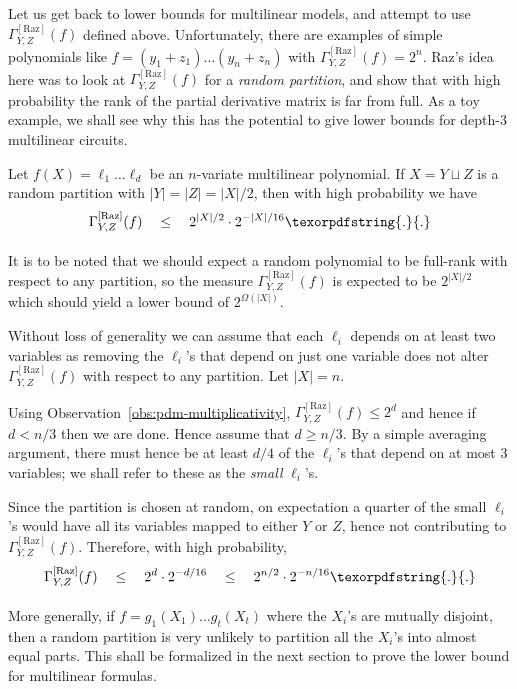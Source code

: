 \documentclass{birkjour}
\newcommand{\CM}[1]{\Gamma^{\mathrm{[#1]}}}
\newcommand{\spaced}[1]{\quad#1\quad}
\providecommand{\DIFaddtex}[1]{{\protect\color{blue}\uwave{#1}}} %
\providecommand{\DIFaddbegin}{} %
\providecommand{\DIFaddend}{} %
\providecommand{\DIFadd}[1]{\texorpdfstring{\DIFaddtex{#1}}{#1}} %
\begin{document}
Let us get back to lower bounds for multilinear models, and attempt to use $\CM{Raz}_{Y,Z}(f)$ defined above. Unfortunately, there are examples of simple polynomials like $f = (y_1 + z_1)\dots (y_n + z_n)$ with $\CM{Raz}_{Y,Z}(f) = 2^n$. Raz's idea here was to look at $\CM{Raz}_{Y,Z}(f)$ for a \emph{random partition}, and show that with high probability the rank of the partial derivative matrix is far from full. As a toy example, we shall see why this has the potential to give lower bounds for depth-$3$ multilinear circuits. 

\begin{lemma}
Let $f(X) = \ell_1 \dots \ell_d$ be an $n$-variate multilinear polynomial. If $X = Y\sqcup Z$ is a random partition with $|Y| = |Z| = |X|/2$, then with high probability we have
$$
\CM{Raz}_{Y,Z}(f) \quad \leq \quad 2^{|X|/2} \cdot 2^{-|X|/16}\DIFaddbegin \DIFadd{.
}\DIFaddend $$
\end{lemma}

It is to be noted that we should expect a random polynomial to be full-rank with respect to any partition, so the measure $\CM{Raz}_{Y,Z}(f)$ is expected to be $2^{|X|/2}$ which should yield a lower bound of $2^{\Omega(|X|)}$. 

\begin{proof-sketch}
Without loss of generality we can assume that each $\ell_i$ depends on at least two variables as removing the $\ell_i$'s that depend on just one variable does not alter $\CM{Raz}_{Y,Z}(f)$ with respect to any partition. Let $|X| = n$. 

Using Observation~\ref{obs:pdm-multiplicativity}, $\CM{Raz}_{Y,Z}(f) \leq 2^d$ and hence if $d < n/3$ then we are done. Hence assume that $d \geq n/3$. By a simple averaging argument, there must hence be at least $d/4$ of the $\ell_i$'s that depend on at most $3$ variables; we shall refer to these as the \emph{small} $\ell_i$'s. 

Since the partition is chosen at random, on expectation a quarter of the small $\ell_i$'s would have all its variables mapped to either $Y$ or $Z$, hence not contributing to $\CM{Raz}_{Y,Z}(f)$. Therefore, with high probability,
$$
\CM{Raz}_{Y,Z}(f) \quad \leq \quad 2^{d} \cdot 2^{-d/16} \spaced{\leq} 2^{n/2} \cdot 2^{-n/16}\DIFaddbegin \DIFadd{.
}\DIFaddend $$
\end{proof-sketch}

More generally, if $f = g_1(X_1)\dots g_t(X_t)$ where the $X_i$'s are mutually disjoint, then a random partition is very unlikely to partition all the $X_i$'s into almost equal parts. This shall be formalized in the next section to prove the lower bound for multilinear formulas. 
\end{document}
